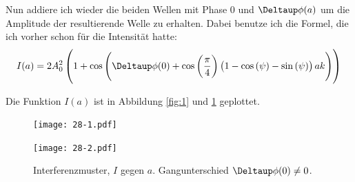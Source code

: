 Nun addiere ich wieder die beiden Wellen mit Phase $0$ und $\Deltaup \phi(a)$ um die Amplitude der resultierende Welle zu erhalten. Dabei benutze ich die Formel, die ich vorher schon für die Intensität hatte:
\[
	I(a) = 2 A_0^2 \del{1 + \cos\del{\Deltaup \phi(0) + \cos\del{\frac \pi 4} \del{1 - \cos\del\psi - \sin\del\psi} ak}}
\]

Die Funktion $I(a)$ ist in Abbildung \ref{fig:1} und \ref{fig:2} geplottet.

\begin{figure}
	\centering
	\begin{minipage}[t]{0.43\linewidth}
	\centering
	\texttt{[image: 28-1.pdf]}
	\caption{%
		Interferenzmuster, $I$ gegen $a$. Es ist ein bestimmter
		Verkippungswinkel $\psi$ ist eingestellt, der Gangunterschied $\Deltaup
		\phi(0)$ ist gleich $0$.
	}
	\label{fig:1}
	\end{minipage}
	\hspace{0.12\linewidth}
	\begin{minipage}[t]{0.43\linewidth}
	\centering
	\texttt{[image: 28-2.pdf]}
	\caption{%
		Interferenzmuster, $I$ gegen $a$. Gangunterschied $\Deltaup \phi(0)
		\neq 0$.
	}
	\label{fig:2}
	\end{minipage}
\end{figure}






